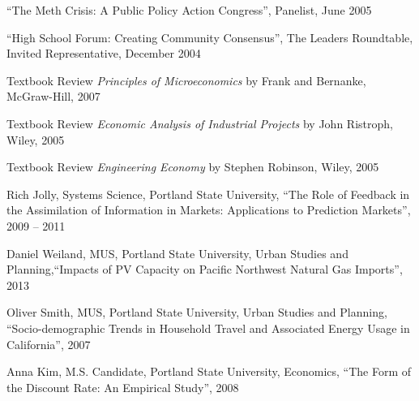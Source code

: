 \documentclass[Computer Science]{vita}
\begin{document}
\begin{vita}
\begin{Community Outreach}
  \item ``The Meth Crisis: A Public Policy Action Congress'',
    Panelist, June 2005

  \item ``High School Forum: Creating Community Consensus'', The
    Leaders Roundtable, Invited Representative, December 2004
  \end{Community Outreach}

  \begin{Instructional Activities}

    \begin{Reviews}
    \item Textbook Review \emph{Principles of Microeconomics} by
      Frank and Bernanke, McGraw-Hill, 2007

    \item Textbook Review \emph{Economic Analysis of Industrial
        Projects} by John Ristroph, Wiley, 2005

    \item Textbook Review \emph{Engineering Economy} by Stephen
      Robinson, Wiley, 2005
    \end{Reviews}

    \begin{Ph.D. Thesis Committee}
    \item Rich Jolly, Systems Science, Portland State University,
      ``The Role of Feedback in the Assimilation of Information in
      Markets: Applications to Prediction Markets'', 2009 -- 2011


    \end{Ph.D. Thesis Committee}

    \begin{M.S. Thesis Adviser}
    \item Daniel Weiland, MUS, Portland State University,
      Urban Studies and Planning,``Impacts of PV Capacity on Pacific Northwest Natural Gas Imports'', 2013
    
    \item Oliver Smith, MUS, Portland State University,
      Urban Studies and Planning, ``Socio-demographic Trends in
      Household Travel and Associated Energy Usage in California'',
      2007

    \end{M.S. Thesis Adviser}

    \begin{M.S. Project Adviser}
    \item Anna Kim, M.S. Candidate, Portland State University,
      Economics, ``The Form of the Discount Rate: An Empirical
      Study'', 2008


\end{M.S. Project Adviser}
\end{Instructional Activities}
\end{vita}
\end{document}
